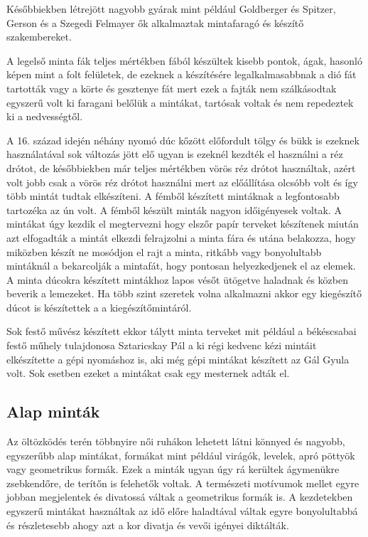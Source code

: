 \documentclass[fontsize=12pt, appendixprefix=true]{scrreprt}
\begin{document}
Későbbiekben létrejött nagyobb gyárak mint például Goldberger és Spitzer, Gerson és a Szegedi Felmayer ők alkalmaztak mintafaragó és készítő szakembereket.

A legelső minta fák teljes mértékben fából készültek kisebb pontok, ágak, hasonló képen mint a folt felületek, de ezeknek a készítésére legalkalmasabbnak a dió fát tartották vagy a körte és gesztenye fát mert ezek a fajták nem szálkásodtak egyszerű volt ki faragani belőlük a mintákat, tartósak voltak és nem repedeztek ki a nedvességtől.

A 16. század idején néhány nyomó dúc kőzött előfordult tölgy és bükk is ezeknek használatával sok változás jött elő ugyan is ezeknél kezdték el használni a réz drótot, de későbbiekben már teljes mértékben vörös réz drótot használtak, azért volt jobb csak a vörös réz drótot használni mert az előállítása olcsóbb volt és így több mintát tudtak elkészíteni.
A fémből készített mintáknak a legfontosabb tartozéka az ún volt. A fémből készült minták nagyon időigényesek voltak. A mintákat úgy kezdik el megtervezni hogy elszőr papír terveket készítenek miután azt elfogadták a mintát elkezdi felrajzolni a minta fára és utána belakozza, hogy miközben készít ne mosódjon el rajt a minta, ritkább vagy bonyolultabb mintáknál a bekarcolják a mintafát, hogy pontosan helyezkedjenek el az elemek.
A minta dúcokra készített mintákhoz lapos vésőt ütögetve haladnak és közben beverik a lemezeket. Ha több szint szeretek volna alkalmazni akkor egy kiegészítő dúcot is készítettek a a kiegészítőmintáról.

Sok festő művész készített ekkor tálytt minta terveket mit például a békéscsabai festő műhely tulajdonosa Sztaricskay Pál a ki régi kedvenc kézi mintáit elkészítette a gépi nyomáshoz is, aki még  gépi mintákat készített az Gál Gyula volt. Sok esetben ezeket a mintákat csak egy mesternek adták el.

\subsection{Alap minták}
Az öltözködés terén többnyire női ruhákon lehetett látni könnyed és nagyobb, egyszerűbb alap mintákat, formákat mint például virágók, levelek, apró pöttyök vagy geometrikus formák.
Ezek a minták ugyan úgy rá kerültek ágymenükre zsebkendőre, de terítőn is felehetők voltak.
A természeti motívumok mellet egyre jobban megjelentek és divatossá váltak a geometrikus formák is.
A kezdetekben egyszerű mintákat használtak az idő előre haladtával váltak egyre bonyolultabbá és részletesebb ahogy azt a kor divatja és vevői igényei diktálták.
\end{document}
